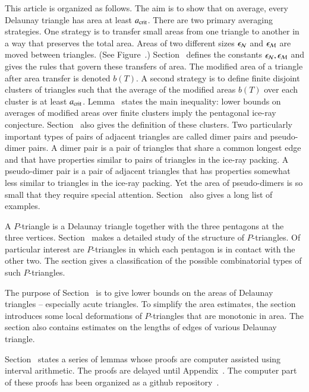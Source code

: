 This article is organized as follows.  The aim is to show that on
average, every Delaunay triangle has area at least $a_\text{crit}$.  There
are two primary averaging strategies.  One strategy is to transfer
small areas from one triangle to another in a way that preserves the
total area.  Areas of two different sizes $\epsilon_{\mathcal N}$ and $\epsilon_{\mathcal M}$ are
moved between triangles. (See Figure~.)  Section~
defines the constants $\epsilon_{\mathcal N},\epsilon_{\mathcal M}$ and gives the rules that govern
these transfers of area.  The modified area of a triangle after area
transfer is denoted $b(T)$.  A second strategy is to define finite
disjoint clusters of triangles such that the average of the modified
areas $b(T)$ over each cluster is at least $a_\text{crit}$.  Lemma~
states the main inequality:
lower bounds on averages of modified areas over finite
clusters imply the pentagonal ice-ray conjecture.
Section~ also gives the definition of these clusters.
Two particularly important types of pairs of adjacent triangles are
called dimer pairs and pseudo-dimer pairs.  A dimer pair is a pair of
triangles that share a common longest edge and that have properties
similar to pairs of triangles in the ice-ray packing.
A pseudo-dimer pair is a pair of adjacent triangles that has properties
somewhat less similar to triangles in the ice-ray packing.  Yet the area
of pseudo-dimers is so small that they require special attention.
Section~ also gives a long list of examples.

A $P$-triangle is a Delaunay triangle together with the three pentagons
at the three vertices. Section~ makes a detailed
study of the structure of $P$-triangles.  Of particular interest are
$P$-triangles in which each pentagon is in contact with the other two.
The section gives a classification of the possible combinatorial types
of such $P$-triangles.

The purpose of Section~ is to give lower bounds
on the areas of Delaunay triangles -- especially acute triangles.
To simplify the area estimates, 
the section introduces some local deformations of $P$-triangles that
are monotonic in area.  The section also contains estimates on
the lengths of edges of various Delaunay triangle.

Section~ states a series of lemmas whose proofs are
computer assisted using interval arithmetic.  The proofs are delayed until 
Appendix~.  The computer part of these proofs has
been organized as a github repository~\cite{Git}.

